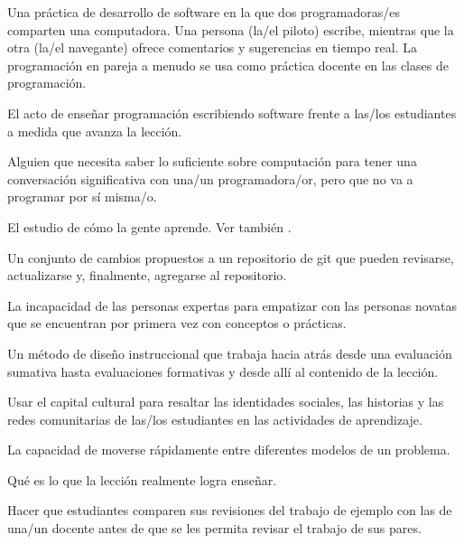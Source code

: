 \begin{description}
 Una práctica de desarrollo de software en la que 
dos programadoras/es comparten una computadora. Una persona (la/el piloto) escribe, mientras que la otra 
(la/el navegante) ofrece comentarios y sugerencias en tiempo real. 
La programación en pareja a menudo se usa como práctica docente en las clases de programación.

 El acto de enseñar programación
escribiendo software frente a las/los estudiantes a medida que avanza la lección.

 Alguien que necesita saber lo suficiente sobre 
computación para tener una conversación significativa con una/un programadora/or, pero que no va a programar por sí misma/o.

 El estudio de cómo
la gente aprende. Ver también .

 Un conjunto de cambios propuestos a un repositorio de
git que pueden revisarse, actualizarse y, finalmente, agregarse al repositorio.

 La incapacidad de las personas expertas
para empatizar con las personas novatas que se encuentran por primera
vez con conceptos o prácticas.

 Un método de diseño instruccional que
trabaja hacia atrás desde una evaluación sumativa hasta evaluaciones formativas y desde allí al contenido de la lección.

 Usar el capital cultural
para resaltar las identidades sociales, las historias y las redes comunitarias de
las/los estudiantes en las actividades de aprendizaje.

 La capacidad de moverse
rápidamente entre diferentes modelos de un problema.

 Qué es lo que la lección realmente logra enseñar.

 Hacer que estudiantes comparen sus
revisiones del trabajo de ejemplo con las de una/un docente antes de que
se les permita revisar el trabajo de sus pares.


\end{description}
